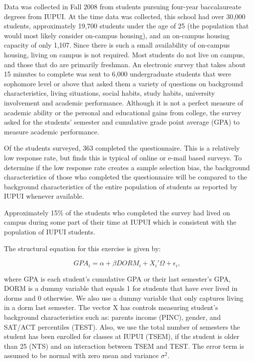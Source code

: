 \documentclass[12pt]{article}
\newcommand{\beq}{\begin{equation}}
\newcommand{\eeq}{\end{equation}}
\newcommand{\citee}[1]{\citename{#1} \citeyear{#1}}
\begin{document}
Data was collected in Fall 2008 from students pursuing four-year baccalaureate degrees from IUPUI. At the time data was collected, this school had over 30,000 students, approximately 19,700 students under the age of 25 (the population that would most likely consider on-campus housing), and an on-campus housing capacity of only 1,107. Since there is such a small availability of on-campus housing, living on campus is not required. Most students do not live on campus, and those that do are primarily freshman. An electronic survey that takes about 15 minutes to complete was sent to 6,000 undergraduate students that were sophomore level or above that asked them a variety of questions on background characteristics, living situations, social habits, study habits, university involvement and academic performance. Although it is not a perfect measure of academic ability or the personal and educational gains from college, the survey asked for the students' semester and cumulative grade point average (GPA) to measure academic performance.

Of the students surveyed, 363 completed the questionnaire. This is a relatively low response rate, but \citee{sax2003} finds this is typical of online or e-mail based surveys. To determine if the low response rate creates a sample selection bias, the background characteristics of those who completed the questionnaire will be compared to the background characteristics of the entire population of students as reported by IUPUI whenever available. \begin{comment}Any anticipated biases will be reported, and may be partially corrected for using a procedure suggested by Heckman (1979).\end{comment} Approximately 15\% of the students who completed the survey had lived on campus during some part of their time at IUPUI which is consistent with the population of IUPUI students.

The structural equation for this exercise is given by:

\beq GPA_i = \alpha + \beta DORM_i + X_i'\Omega + \epsilon_i ,\label{eq:struct} \eeq

\noindent where GPA is each student's cumulative GPA or their last semester's GPA, DORM is a dummy variable that equals 1 for students that have ever lived in dorms and 0 otherwise. We also use a dummy variable that only captures living in a dorm last semester. The vector X has controls measuring student's background characteristics such as: parents income (PINC), gender, and SAT/ACT percentiles (TEST). Also, we use the total number of semesters the student has been enrolled for classes at IUPUI (TSEM), if the student is older than 25 (NTS) and an interaction between TSEM and TEST. The error term is assumed to be normal with zero mean and variance $\sigma^2$. 
\end{document}
